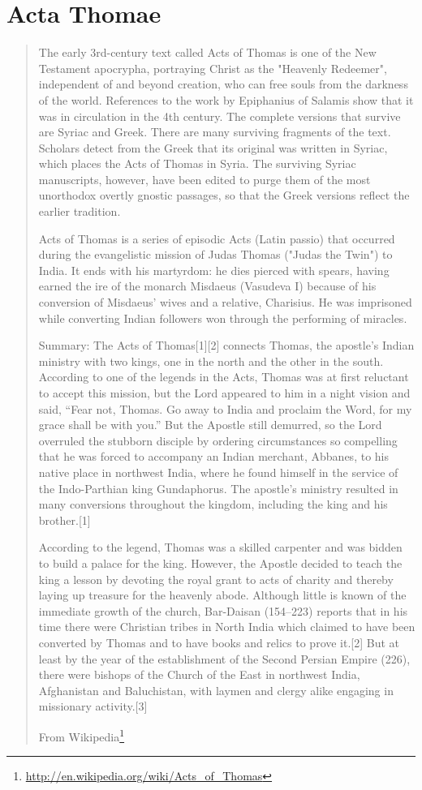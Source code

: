 \documentclass[12pt,letterpaper,twoside,final]{memoir}
\begin{document}
\section{Acta Thomae}
\blockquote[From Wikipedia\footnote{\url{http://en.wikipedia.org/wiki/Acts_of_Thomas}}]{The early 3rd-century text called Acts of Thomas is one of the New Testament apocrypha, portraying Christ as the "Heavenly Redeemer", independent of and beyond creation, who can free souls from the darkness of the world. References to the work by Epiphanius of Salamis show that it was in circulation in the 4th century. The complete versions that survive are Syriac and Greek. There are many surviving fragments of the text. Scholars detect from the Greek that its original was written in Syriac, which places the Acts of Thomas in Syria. The surviving Syriac manuscripts, however, have been edited to purge them of the most unorthodox overtly gnostic passages, so that the Greek versions reflect the earlier tradition.

Acts of Thomas is a series of episodic Acts (Latin passio) that occurred during the evangelistic mission of Judas Thomas ("Judas the Twin") to India. It ends with his martyrdom: he dies pierced with spears, having earned the ire of the monarch Misdaeus (Vasudeva I) because of his conversion of Misdaeus' wives and a relative, Charisius. He was imprisoned while converting Indian followers won through the performing of miracles.

Summary: The Acts of Thomas[1][2] connects Thomas, the apostle's Indian ministry with two kings, one in the north and the other in the south. According to one of the legends in the Acts, Thomas was at first reluctant to accept this mission, but the Lord appeared to him in a night vision and said, “Fear not, Thomas. Go away to India and proclaim the Word, for my grace shall be with you.” But the Apostle still demurred, so the Lord overruled the stubborn disciple by ordering circumstances so compelling that he was forced to accompany an Indian merchant, Abbanes, to his native place in northwest India, where he found himself in the service of the Indo-Parthian king Gundaphorus. The apostle's ministry resulted in many conversions throughout the kingdom, including the king and his brother.[1]

According to the legend, Thomas was a skilled carpenter and was bidden to build a palace for the king. However, the Apostle decided to teach the king a lesson by devoting the royal grant to acts of charity and thereby laying up treasure for the heavenly abode. Although little is known of the immediate growth of the church, Bar-Daisan (154–223) reports that in his time there were Christian tribes in North India which claimed to have been converted by Thomas and to have books and relics to prove it.[2] But at least by the year of the establishment of the Second Persian Empire (226), there were bishops of the Church of the East in northwest India, Afghanistan and Baluchistan, with laymen and clergy alike engaging in missionary activity.[3]

}
\end{document}
